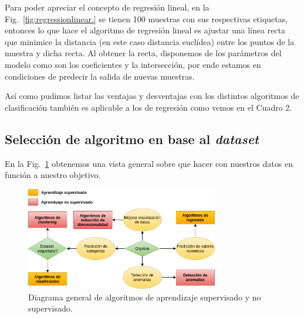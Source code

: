 \documentclass[a4paper,12pt]{article}
\begin{document}
Para poder apreciar el concepto de regresión lineal, en la Fig.~\ref{fig:regressionlinear.} se tienen 100 muestras con sus respectivas etiquetas, entonces lo que hace el algoritmo de regresión lineal es ajustar una línea recta que minimice la distancia (en este caso distancia euclídea) entre los puntos de la muestra y dicha recta. Al obtener la recta, disponemos de los parámetros del modelo como son los coeficientes y la intersección, por ende estamos en condiciones de predecir la salida de nuevas muestras.

Así como pudimos listar las ventajas y desventajas con los distintos algoritmos de clasificación también es aplicable a los de regresión como vemos en el Cuadro 2.



\subsection{Selección de algoritmo en base al \textit{dataset}}
En la Fig.~\ref{fig:maindiagram.} obtenemos una vista general sobre que hacer con nuestros datos en función a nuestro objetivo.

\begin{figure}[H]
	\begin{center}
		\includegraphics[width=0.75\textwidth]{maindiagram.png}
		\caption{Diagrama general de algoritmos de aprendizaje supervisado y no supervisado.}
		\label{fig:maindiagram.}
	\end{center}
\end{figure}
\end{document}
